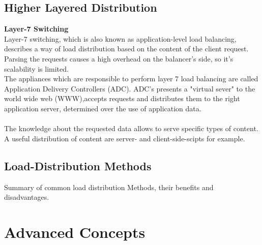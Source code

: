 \documentclass[12p]{article}
\begin{document}
	\subsection{Higher Layered Distribution}
	\textbf{Layer-7 Switching}\\
	Layer-7 switching, which is also known as application-level load balancing, describes a way of load distribution based on the content of the client request. Parsing the requests causes a high overhead on the balancer's side, so it's scalability is limited.\\
	The appliances which are responsible to perform layer 7 load balancing are called Application Delivery Controllers (\gls{ADC}). \gls{ADC}'s presents a "virtual sever" to the world wide web (\gls{WWW}),accepts requests and distributes them to the right application server, determined over the use of application data.\\
	\\
	The knowledge about the requested data allows to serve specific types of content. A useful distribution of content are server- and client-side-scipts for example. \cite{AppLayerBalancing}
	
	\subsection{Load-Distribution Methods}
	Summary of common load distribution Methods, their benefits and disadvantages.
	
	\newpage
	\section{Advanced Concepts}
\end{document}
